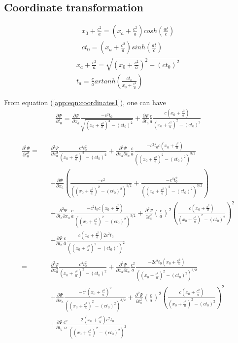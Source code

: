 \documentclass[prd,showpacs,preprint]{revtex4-1}
\begin{document}
\begin{appendix}
\section{Coordinate transformation\label{app:Coordinate_Transformation}}
\begin{eqnarray}
x_0+\frac{c^2}{a}=(x_a+\frac{c^2}{a})cosh(\frac{at}{c})\nonumber\\
ct_0=(x_a+\frac{c^2}{a})sinh(\frac{at}{c})
\label{app:eqn:coordinates0}
\end{eqnarray}
\begin{eqnarray}
x_a+\frac{c^2}{a}=\sqrt{(x_0+\frac{c^2}{a})^2-(ct_0)^2}\nonumber\\
t_a=\frac{c}{a}artanh(\frac{ct_0}{x_0+\frac{c^2}{a}})
\label{app:eqn:coordinates1}
\end{eqnarray}

From equation (\ref{app:eqn:coordinates1}), one can have
\begin{eqnarray}
\frac{\partial \Psi}{\partial t_0}=\frac{\partial \Psi}{\partial x_a}\frac{-c^2t_0}{\sqrt{(x_0+\frac{c^2}{a})^2 - (ct_0)^2}} + \frac{\partial \Psi}{\partial t_a}\frac{c}{a}\frac{c(x_0+\frac{c^2}{a})}{(x_0+\frac{c^2}{a})^2-(ct_0)^2}
\label{eqn:Partial_Psi}
\end{eqnarray}

\begin{eqnarray}
\frac{\partial^2 \Psi}{\partial t_0^2}=&&\frac{\partial^2 \Psi}{\partial x_a^2}\frac{c^4t_0^2}{(x_0+\frac{c^2}{a})^2 - (ct_0)^2} + \frac{\partial^2 \Psi}{\partial x_a\partial t_a}\frac{c}{a}\frac{-c^2t_0c(x_0+\frac{c^2}{a})}{((x_0+\frac{c^2}{a})^2-(ct_0)^2)^{3/2}}\nonumber\\
&& + \frac{\partial \Psi}{\partial x_a}(\frac{-c^2}{((x_0+\frac{c^2}{a})^2-(ct_0)^2)^{1/2}} + \frac{-c^4t_0^2}{((x_0+\frac{c^2}{a})^2-(ct_0)^2)^{3/2}})\nonumber\\
&& + \frac{\partial^2 \Psi}{\partial t_a\partial x_a}\frac{c}{a}\frac{-c^2t_0c(x_0+\frac{c^2}{a})}{((x_0+\frac{c^2}{a})^2-(ct_0)^2)^{3/2}} + \frac{\partial^2 \Psi}{\partial t_a^2}(\frac{c}{a})^2(\frac{c(x_0+\frac{c^2}{a})}{(x_0+\frac{c^2}{a})^2-(ct_0)^2})^2\nonumber\\
&&+\frac{\partial \Psi}{\partial t_a}\frac{c}{a}\frac{c(x_0+\frac{c^2}{a})2c^2t_0}{((x_0+\frac{c^2}{a})^2-(ct_0)^2)^2}\nonumber\\
=&&\frac{\partial^2 \Psi}{\partial x_a^2}\frac{c^4t_0^2}{(x_0+\frac{c^2}{a})^2 - (ct_0)^2} + \frac{\partial^2 \Psi}{\partial x_a\partial t_a}\frac{c^2}{a}\frac{-2c^2t_0(x_0+\frac{c^2}{a})}{((x_0+\frac{c^2}{a})^2-(ct_0)^2)^{3/2}}\nonumber\\
&& + \frac{\partial \Psi}{\partial x_a}\frac{-c^2(x_0+\frac{c^2}{a})^2}{((x_0+\frac{c^2}{a})^2-(ct_0)^2)^{3/2}} + \frac{\partial^2 \Psi}{\partial t_a^2}(\frac{c}{a})^2(\frac{c(x_0+\frac{c^2}{a})}{(x_0+\frac{c^2}{a})^2-(ct_0)^2})^2\nonumber\\
&& + \frac{\partial \Psi}{\partial t_a}\frac{c^2}{a}\frac{2(x_0+\frac{c^2}{a})c^2t_0}{((x_0+\frac{c^2}{a})^2-(ct_0)^2)^2}
\label{app:eqn:Partial2_Psi_Partial_t2}
\end{eqnarray}


\end{appendix}
\end{document}
